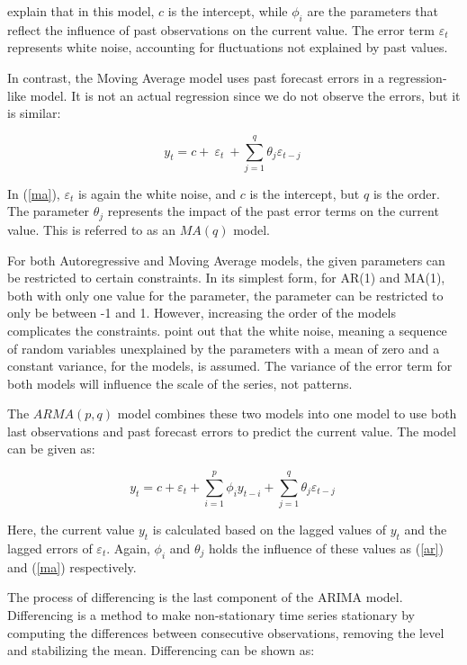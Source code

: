 \documentclass[12pt,a4paper]{article}
\begin{document}
\cite{HyndmanForecasting2021} explain that in this model, $c$ is the intercept, while $\phi_i$ are the parameters that reflect the influence of past observations on the current value. The error term $\varepsilon_t$ represents white noise, accounting for fluctuations not explained by past values.

In contrast, the Moving Average model uses past forecast errors in a regression-like model. It is not an actual regression since we do not observe the errors, but it is similar: 

\begin{equation}
  y_t=c+\ \varepsilon_t\ +\sum_{j=1}^{q}{\theta_j\varepsilon_{t-j}\ }
  \label{ma}
\end{equation}

In (\ref{ma}), $\varepsilon_t$ is again the white noise, and $c$ is the intercept, but $q$ is the order. The parameter $\theta_j$ represents the impact of the past error terms on the current value. This is referred to as an $MA(q)$ model. 

For both Autoregressive and Moving Average models, the given parameters can be restricted to certain constraints. In its simplest form, for AR(1) and MA(1), both with only one value for the parameter, the parameter can be restricted to only be between -1 and 1. However, increasing the order of the models complicates the constraints. \cite{HyndmanForecasting2021} point out that the white noise, meaning a sequence of random variables unexplained by the parameters with a mean of zero and a constant variance, for the models, is assumed. The variance of the error term for both models will influence the scale of the series, not patterns.

The $ARMA(p, q)$ model combines these two models into one model to use both last observations and past forecast errors to predict the current value. The model can be given as: 

\begin{equation}
  y_t=c+\varepsilon_t+\sum_{i=1}^{p}{\phi_iy_{t-i}}+\sum_{j=1}^{q}{\theta_j\varepsilon_{t-j}\ }
  \label{arma}
\end{equation}

Here, the current value $y_t$ is calculated based on the lagged values of $y_t$ and the lagged errors of $\varepsilon_t$. Again, $\phi_i$ and $\theta_j$ holds the influence of these values as (\ref{ar}) and (\ref{ma}) respectively.

The process of differencing is the last component of the ARIMA model. Differencing is a method to make non-stationary time series stationary by computing the differences between consecutive observations, removing the level and stabilizing the mean. Differencing can be shown as: 
\end{document}
